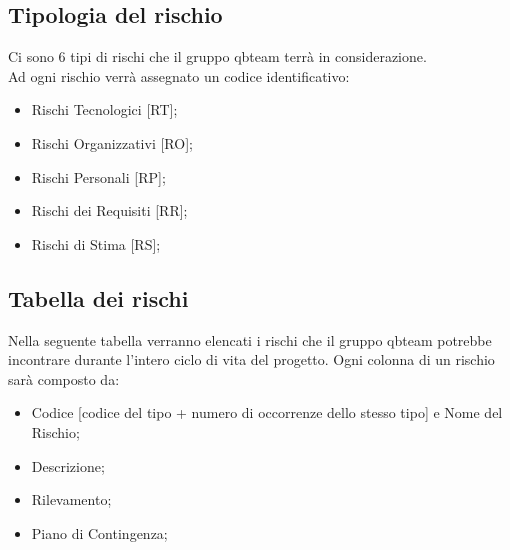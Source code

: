 \subsection{Tipologia del rischio}
Ci sono 6 tipi di rischi che il gruppo qbteam terrà in considerazione. 
\\Ad ogni rischio verrà assegnato un codice identificativo:
\begin{itemize}
	\item Rischi Tecnologici [RT];
	\item Rischi Organizzativi [RO];
	\item Rischi Personali [RP];
	\item Rischi dei Requisiti [RR];
	\item Rischi di Stima [RS];
\end{itemize}

\subsection{Tabella dei rischi}
Nella seguente tabella verranno elencati i rischi che il gruppo qbteam potrebbe incontrare durante l'intero ciclo di vita del progetto.
Ogni colonna di un rischio sarà composto da:
\begin{itemize}
	\item Codice [codice del tipo + numero di occorrenze dello stesso tipo] e Nome del Rischio;
	\item Descrizione;
	\item Rilevamento;
	\item Piano di Contingenza;
\end{itemize}


